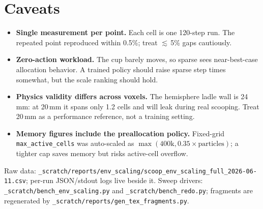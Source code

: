 \documentclass[a4paper,11pt]{article}
\begin{document}
\section{Caveats}
\label{sec:caveats}

\begin{itemize}[leftmargin=1.4em, itemsep=0.18em]
  \item \textbf{Single measurement per point.} Each cell is one 120-step run. The repeated point
        reproduced within 0.5\%; treat $\lesssim$\,5\% gaps cautiously.
  \item \textbf{Zero-action workload.} The cup barely moves, so sparse sees near-best-case
        allocation behavior. A trained policy should raise sparse step times somewhat, but the
        scale ranking should hold.
  \item \textbf{Physics validity differs across voxels.} The hemisphere ladle wall is 24\,mm: at
        20\,mm it spans only 1.2 cells and will leak during real scooping. Treat 20\,mm as a
        performance reference, not a training setting.
  \item \textbf{Memory figures include the preallocation policy.} Fixed-grid
        \texttt{max\_active\_cells} was auto-scaled as
        $\max(400\text{k}, 0.35 \times \text{particles})$; a tighter cap saves memory but risks
        active-cell overflow.
\end{itemize}

\vspace{0.8em}
{\small\color{ReportMuted}%
Raw data: \texttt{\_scratch/reports/env\_scaling/scoop\_env\_scaling\_full\_2026-06-11.csv};
per-run JSON/stdout logs live beside it. Sweep drivers: \texttt{\_scratch/bench\_env\_scaling.py}
and \texttt{\_scratch/bench\_redo.py}; fragments are regenerated by
\texttt{\_scratch/reports/gen\_tex\_fragments.py}.}
\end{document}
